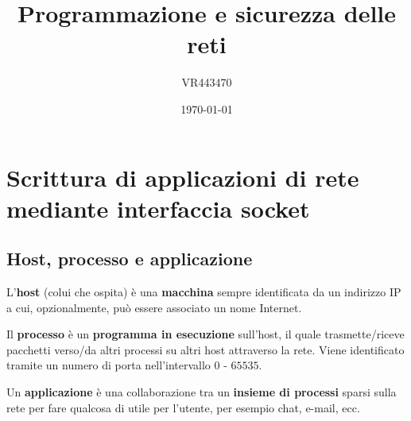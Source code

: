 \documentclass[a4paper]{article}
\begin{document}
	\author{VR443470}
	\title{Programmazione e sicurezza delle reti}
	\date{\printdayoff\today}
	\maketitle
	
	\newpage
	
	\tableofcontents
	
	\newpage
	
	\section{Scrittura di applicazioni di rete mediante interfaccia socket}
	
	\subsection{Host, processo e applicazione}
	
	L'\textcolor{Red3}{\textbf{host}} (colui che ospita) è una \textbf{macchina} sempre identificata da un indirizzo IP a cui, opzionalmente, può essere associato un nome Internet.\newline
	
	\noindent
	Il \textcolor{Red3}{\textbf{processo}} è un \textbf{programma in esecuzione} sull'host, il quale trasmette/riceve pacchetti verso/da altri processi su altri host attraverso la rete. Viene identificato tramite un numero di porta nell'intervallo $0$ - $65535$.\newline
	
	\noindent
	Un \textcolor{Red3}{\textbf{applicazione}} è una collaborazione tra un \textbf{insieme di processi} sparsi sulla rete per fare qualcosa di utile per l'utente, per esempio chat, e-mail, ecc.\newline
	
\end{document}
